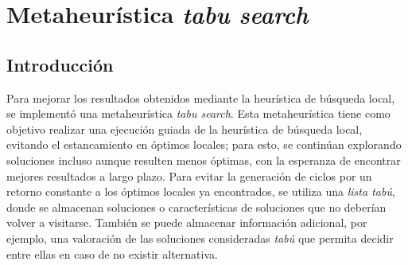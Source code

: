 \section{Metaheurística \emph{tabu search}}


\subsection{Introducción}
Para mejorar los resultados obtenidos mediante la heurística de búsqueda
local, se implementó una metaheurística \emph{tabu search}. Esta
metaheurística tiene como objetivo realizar una ejecución guiada de la
heurística de búsqueda local, evitando el estancamiento en óptimos locales;
para esto, se continúan explorando soluciones incluso aunque resulten menos
óptimas, con la esperanza de encontrar mejores resultados a largo plazo. Para
evitar la generación de ciclos por un retorno constante a los óptimos locales
ya encontrados, se utiliza una \emph{lista tabú}, donde se almacenan
soluciones o características de soluciones que no deberían volver a visitarse.
También se puede almacenar información adicional, por ejemplo, una valoración
de las soluciones consideradas \emph{tabú} que permita decidir entre ellas en
caso de no existir alternativa.

